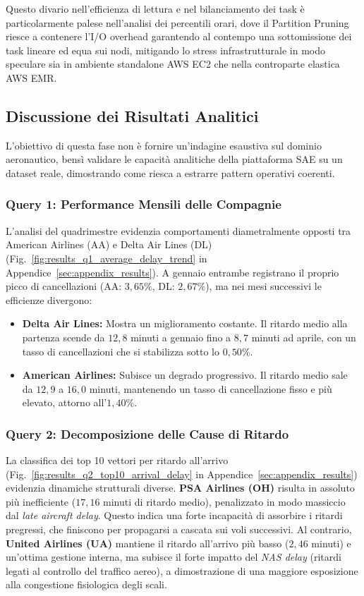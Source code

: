 \documentclass[conference]{IEEEtran}
\begin{document}
Questo divario nell'efficienza di lettura e nel bilanciamento dei task è particolarmente palese nell'analisi dei percentili orari, dove il Partition Pruning riesce a contenere l'I/O overhead garantendo al contempo una sottomissione dei task lineare ed equa sui nodi, mitigando lo stress infrastrutturale in modo speculare sia in ambiente standalone AWS EC2 che nella controparte elastica AWS EMR\@.

\subsection{Discussione dei Risultati Analitici}\label{subsec:analytical_results_discussion}

L'obiettivo di questa fase non è fornire un'indagine esaustiva sul dominio aeronautico, bensì validare le capacità analitiche della piattaforma SAE su un dataset reale, dimostrando come riesca a estrarre pattern operativi coerenti.

\subsubsection{Query 1: Performance Mensili delle Compagnie}
L'analisi del quadrimestre evidenzia comportamenti diametralmente opposti tra American Airlines (AA) e Delta Air Lines (DL) (Fig.~\ref{fig:results_q1_average_delay_trend} in Appendice~\ref{sec:appendix_results}). A gennaio entrambe registrano il proprio picco di cancellazioni (AA: $3,65\%$, DL: $2,67\%$), ma nei mesi successivi le efficienze divergono:
\begin{itemize}
    \item \textbf{Delta Air Lines:} Mostra un miglioramento costante.
    Il ritardo medio alla partenza scende da $12,8$ minuti a gennaio fino a $8,7$ minuti ad aprile, con un tasso di cancellazioni che si stabilizza sotto lo $0,50\%$.
    \item \textbf{American Airlines:} Subisce un degrado progressivo.
    Il ritardo medio sale da $12,9$ a $16,0$ minuti, mantenendo un tasso di cancellazione fisso e più elevato, attorno all'$1,40\%$.
\end{itemize}

\subsubsection{Query 2: Decomposizione delle Cause di Ritardo}
La classifica dei top 10 vettori per ritardo all'arrivo (Fig.~\ref{fig:results_q2_top10_arrival_delay} in Appendice~\ref{sec:appendix_results}) evidenzia dinamiche strutturali diverse.
\textbf{PSA Airlines (OH)} risulta in assoluto più inefficiente ($17,16$ minuti di ritardo medio), penalizzato in modo massiccio dal \textit{late aircraft delay}.
Questo indica una forte incapacità di assorbire i ritardi pregressi, che finiscono per propagarsi a cascata sui voli successivi.
Al contrario, \textbf{United Airlines (UA)} mantiene il ritardo all'arrivo più basso ($2,46$ minuti) e un'ottima gestione interna, ma subisce il forte impatto del \textit{NAS delay} (ritardi legati al controllo del traffico aereo), a dimostrazione di una maggiore esposizione alla congestione fisiologica degli scali.
\end{document}
